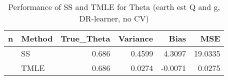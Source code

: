 \documentclass[
]{article}
\begin{document}
\newpage
\begin{table}

\caption{\label{tab:unnamed-chunk-14}Performance of SS and TMLE for Theta (earth est Q and g, DR-learner, no CV)}
\centering
\fontsize{9}{11}\selectfont
\begin{tabular}[t]{rlrrrr}
\toprule
n & Method & True\_Theta & Variance & Bias & MSE\\
\midrule
 & SS & 0.686 & 0.4599 & 4.3097 & 19.0335\\

\multirow{-2}{*}{\raggedleft\arraybackslash 1000} & TMLE & 0.686 & 0.0274 & -0.0071 & 0.0275\\
\bottomrule
\end{tabular}
\end{table}
\end{document}
